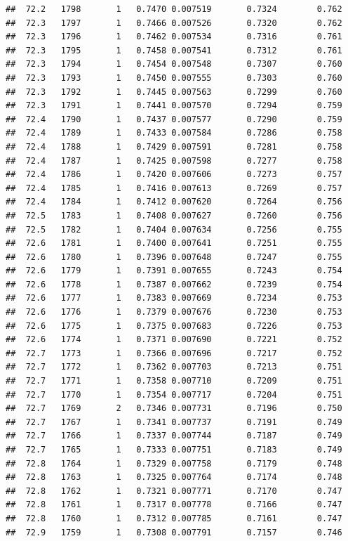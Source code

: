 \documentclass[
]{book}
\begin{document}
\begin{verbatim}
##  72.2   1798       1   0.7470 0.007519       0.7324        0.762
##  72.3   1797       1   0.7466 0.007526       0.7320        0.762
##  72.3   1796       1   0.7462 0.007534       0.7316        0.761
##  72.3   1795       1   0.7458 0.007541       0.7312        0.761
##  72.3   1794       1   0.7454 0.007548       0.7307        0.760
##  72.3   1793       1   0.7450 0.007555       0.7303        0.760
##  72.3   1792       1   0.7445 0.007563       0.7299        0.760
##  72.3   1791       1   0.7441 0.007570       0.7294        0.759
##  72.4   1790       1   0.7437 0.007577       0.7290        0.759
##  72.4   1789       1   0.7433 0.007584       0.7286        0.758
##  72.4   1788       1   0.7429 0.007591       0.7281        0.758
##  72.4   1787       1   0.7425 0.007598       0.7277        0.758
##  72.4   1786       1   0.7420 0.007606       0.7273        0.757
##  72.4   1785       1   0.7416 0.007613       0.7269        0.757
##  72.4   1784       1   0.7412 0.007620       0.7264        0.756
##  72.5   1783       1   0.7408 0.007627       0.7260        0.756
##  72.5   1782       1   0.7404 0.007634       0.7256        0.755
##  72.6   1781       1   0.7400 0.007641       0.7251        0.755
##  72.6   1780       1   0.7396 0.007648       0.7247        0.755
##  72.6   1779       1   0.7391 0.007655       0.7243        0.754
##  72.6   1778       1   0.7387 0.007662       0.7239        0.754
##  72.6   1777       1   0.7383 0.007669       0.7234        0.753
##  72.6   1776       1   0.7379 0.007676       0.7230        0.753
##  72.6   1775       1   0.7375 0.007683       0.7226        0.753
##  72.6   1774       1   0.7371 0.007690       0.7221        0.752
##  72.7   1773       1   0.7366 0.007696       0.7217        0.752
##  72.7   1772       1   0.7362 0.007703       0.7213        0.751
##  72.7   1771       1   0.7358 0.007710       0.7209        0.751
##  72.7   1770       1   0.7354 0.007717       0.7204        0.751
##  72.7   1769       2   0.7346 0.007731       0.7196        0.750
##  72.7   1767       1   0.7341 0.007737       0.7191        0.749
##  72.7   1766       1   0.7337 0.007744       0.7187        0.749
##  72.7   1765       1   0.7333 0.007751       0.7183        0.749
##  72.8   1764       1   0.7329 0.007758       0.7179        0.748
##  72.8   1763       1   0.7325 0.007764       0.7174        0.748
##  72.8   1762       1   0.7321 0.007771       0.7170        0.747
##  72.8   1761       1   0.7317 0.007778       0.7166        0.747
##  72.8   1760       1   0.7312 0.007785       0.7161        0.747
##  72.9   1759       1   0.7308 0.007791       0.7157        0.746

\end{verbatim}
\end{document}
